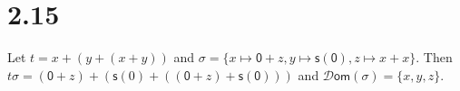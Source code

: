 \documentclass[autodetect-engine]{article}
\theoremstyle{plain}
\theoremstyle{definition}
\theoremstyle{definition}
\newcommand{\m}[1]{\mathsf{#1}}
\begin{document}
\section*{2.15}
Let $t = x + (y + (x + y))$ and $\sigma = \{x \mapsto \m{0}+z, y \mapsto \m{s}(\m{0}), z \mapsto x + x\}$.
Then $t\sigma = (\m{0} + z) + (\m{s}(0) + ((\m{0} + z) + \m{s}(\m{0})))$ and
$\mathcal{D}\mathsf{om}(\sigma) = \{x,y,z\}$.
\end{document}
